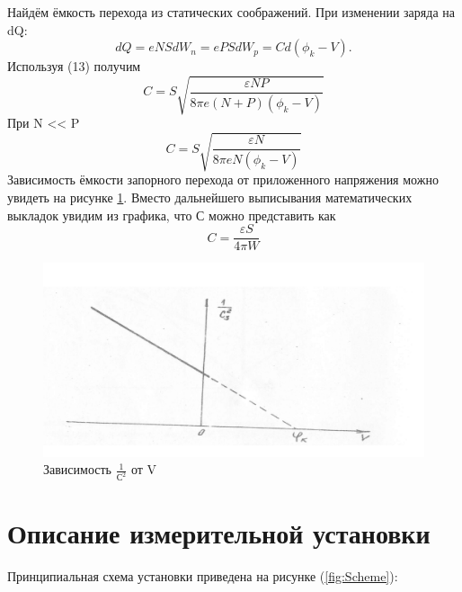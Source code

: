\documentclass[a4paper]{article}
\begin{document}
    
    
    Найдём ёмкость перехода из статических соображений. При изменении заряда на dQ:
    \begin{equation}
        dQ = eNSdW_n = ePSdW_p = Cd(\phi_k-V).
    \end{equation}
    Используя (13) получим
    \begin{equation}
        C=S\sqrt{\frac{\varepsilon N P}{8\pi e(N+P)(\phi_k-V)}}
    \end{equation}
    При N << P
    \begin{equation}
        C=S\sqrt{\frac{\varepsilon N}{8\pi e N(\phi_k-V)}}
    \end{equation}
    Зависимость ёмкости запорного перехода от приложенного напряжения можно увидеть на рисунке \ref{fig:Condecer}. Вместо дальнейшего выписывания математических выкладок увидим из графика, что С можно представить как
            \begin{equation}
        C=\frac{\varepsilon S}{4\pi W}
    \end{equation}
    
    \begin{figure}[h!]
    \centering
    \includegraphics[scale=0.13]{Condecer.jpg}
    \caption{Зависимость $\frac{1}{С^2}$ от V}
    \label{fig:Condecer}
\end{figure}
    
\section{Описание измерительной установки}
Принципиальная схема установки приведена на рисунке (\ref{fig:Scheme}):
\end{document}
